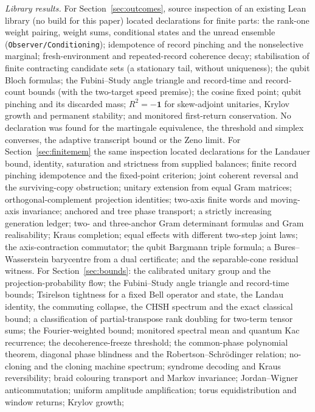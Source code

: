\documentclass[aps,pra,onecolumn,superscriptaddress,nofootinbib,10pt]{revtex4-2}
\theoremstyle{definition}
\theoremstyle{remark}
\begin{document}
{\sloppy\emph{Library results.}  For Section~\ref{sec:outcomes}, source inspection of an existing Lean library (no build
for this paper) located declarations for finite parts: the rank-one weight pairing, weight sums,
conditional states and the unread ensemble (\texttt{Observer/Conditioning}); idempotence of record pinching and
the nonselective marginal; fresh-environment and repeated-record coherence decay; stabilisation of finite
contracting candidate sets (a stationary tail, without uniqueness); the qubit Bloch formulas; the
Fubini--Study angle triangle and record-time and record-count bounds (with the two-target speed premise);
the cosine fixed point; qubit pinching and its discarded mass; $R^2=-\mathbf1$ for skew-adjoint unitaries, Krylov growth
and permanent stability; and monitored first-return conservation.  No declaration was found for the
martingale equivalence, the threshold and simplex converses, the adaptive transcript bound or the Zeno
limit.  For Section~\ref{sec:finitemem} the same inspection located declarations for the Landauer bound, identity,
saturation and strictness from supplied balances; finite record pinching idempotence and the fixed-point
criterion; joint coherent reversal and the surviving-copy obstruction; unitary extension from equal Gram
matrices; orthogonal-complement projection identities; two-axis finite words and moving-axis invariance;
anchored and tree phase transport; a strictly increasing generation ledger; two- and three-anchor Gram
determinant formulas and Gram realisability; Kraus completion; equal effects with different two-step
joint laws; the axis-contraction commutator; the qubit Bargmann triple formula; a Bures--Wasserstein
barycentre from a dual certificate; and the separable-cone residual witness.  For Section~\ref{sec:bounds}:
the calibrated unitary group and the projection-probability flow; the Fubini--Study angle triangle and
record-time bounds; Tsirelson tightness for a fixed Bell operator and state, the Landau identity, the
commuting collapse, the CHSH spectrum and the exact classical bound; a classification of partial-transpose
rank doubling for two-term tensor sums; the Fourier-weighted bound; monitored spectral mean and quantum
Kac recurrence; the decoherence-freeze threshold; the common-phase polynomial theorem, diagonal phase
blindness and the Robertson--Schr\"odinger relation; no-cloning and the cloning machine spectrum; syndrome
decoding and Kraus reversibility; braid colouring transport and Markov invariance; Jordan--Wigner
anticommutation; uniform amplitude amplification; torus equidistribution and window returns; Krylov growth;
}
\end{document}
